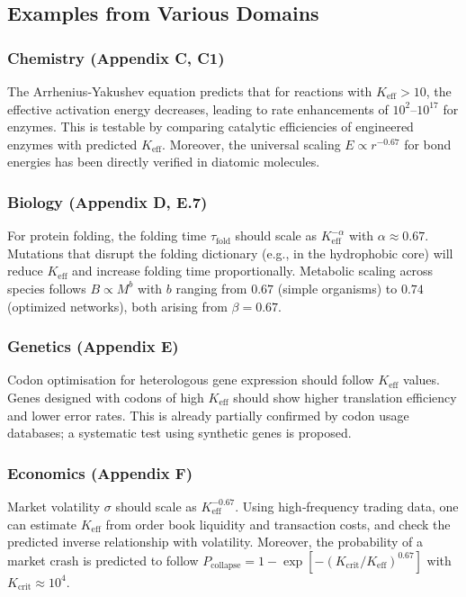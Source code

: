 \documentclass[11pt]{article}
\theoremstyle{remark}
\newcommand{\Keff}{K_{\mathrm{eff}}}
\begin{document}
	\subsection{Examples from Various Domains}
	\subsubsection{Chemistry (Appendix C, C1)}
	The Arrhenius‑Yakushev equation predicts that for reactions with $\Keff > 10$, the effective activation energy decreases, leading to rate enhancements of $10^2$–$10^{17}$ for enzymes. This is testable by comparing catalytic efficiencies of engineered enzymes with predicted $\Keff$. Moreover, the universal scaling $E \propto r^{-0.67}$ for bond energies has been directly verified in diatomic molecules.
	
	\subsubsection{Biology (Appendix D, E.7)}
	For protein folding, the folding time $\tau_{\text{fold}}$ should scale as $\Keff^{-\alpha}$ with $\alpha \approx 0.67$. Mutations that disrupt the folding dictionary (e.g., in the hydrophobic core) will reduce $\Keff$ and increase folding time proportionally. Metabolic scaling across species follows $B \propto M^{b}$ with $b$ ranging from $0.67$ (simple organisms) to $0.74$ (optimized networks), both arising from $\beta = 0.67$.
	
	\subsubsection{Genetics (Appendix E)}
	Codon optimisation for heterologous gene expression should follow $\Keff$ values. Genes designed with codons of high $\Keff$ should show higher translation efficiency and lower error rates. This is already partially confirmed by codon usage databases; a systematic test using synthetic genes is proposed.
	
	\subsubsection{Economics (Appendix F)}
	Market volatility $\sigma$ should scale as $\Keff^{-0.67}$. Using high‑frequency trading data, one can estimate $\Keff$ from order book liquidity and transaction costs, and check the predicted inverse relationship with volatility. Moreover, the probability of a market crash is predicted to follow $P_{\text{collapse}} = 1 - \exp[-(K_{\text{crit}}/\Keff)^{0.67}]$ with $K_{\text{crit}} \approx 10^4$.
	
\end{document}
